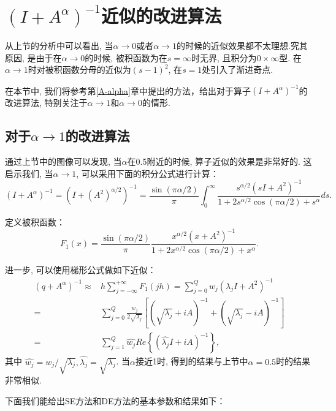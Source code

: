 \section{\((I+{A}^{\alpha})^{-1} \)近似的改进算法}
从上节的分析中可以看出, 当\(\alpha \rightarrow 0\)或者\(\alpha \rightarrow 1\)的时候的近似效果都不太理想.究其原因, 是由于在\(\alpha \rightarrow 0 \)的时候, 被积函数为在\(s=\infty\)时无界, 且积分为\(0\times\infty\)型. 
在$\alpha \rightarrow 1$时对被积函数分母的近似为$(s-1)^2$, 在$s=1$处引入了渐进奇点. 

在本节中, 我们将参考第\ref{A-alpha}章中提出的方法，给出对于算子\((I+A^{\alpha})^{-1}\)的改进算法, 特别关注于\(\alpha\rightarrow 1\)和\(\alpha \rightarrow 0\)的情形. 
\subsection{对于$\alpha \rightarrow 1$的改进算法}
通过上节中的图像可以发现, 当\(\alpha\)在0.5附近的时候, 算子近似的效果是非常好的. 这启示我们, 当$\alpha \rightarrow 1$, 可以采用下面的积分公式进行计算：
\begin{equation}\label{se1_q}
	(I+A^{\alpha})^{-1}=(I+(A^2)^{\alpha/2})^{-1}
	=\frac{\sin(\pi \alpha /2)}{\pi}\int_0^{\infty}\frac{s^{\alpha/2}(sI+A^2)^{-1}}{1+2s^{\alpha/2}\cos(\pi \alpha/2)+s^{\alpha}}ds	.
\end{equation}

定义被积函数：
\begin{equation}
	F_{1}(x)
	=\frac{\sin(\pi \alpha /2)}{\pi}\frac{x^{\alpha/2}(x+A^2)^{-1}}{1+2x^{\alpha/2}\cos(\pi \alpha/2)+x^{\alpha}}.
\end{equation}

进一步, 可以使用梯形公式做如下近似：
\begin{equation}\label{trap_se1}
	\begin{aligned}
		(q+{A}^{\alpha})^{-1}\approx & h\sum_{j=-\infty}^{+\infty} F_1(jh)
		=\sum_{j=0}^{Q}w_j(\lambda_jI+A^2)^{-1}\\
		=&\sum_{j=0}^{Q}\frac{w_j}{2\sqrt{\lambda_j}}\left[\left(\sqrt{\lambda_j}+iA\right)^{-1}+\left(\sqrt{\lambda_j}-iA\right)^{-1}\right]\\
		=&\sum_{j=1}^{Q}\hat{w_j}Re\left\{\left(\hat{\lambda_j}I+iA\right)^{-1}\right\},
	\end{aligned}
\end{equation}
其中 $\hat{w_j}=w_j/\sqrt{\lambda_j}, \hat{\lambda_j}=\sqrt{\lambda_j}$.
当$\alpha$接近1时, 得到的结果与上节中$\alpha=0.5$时的结果非常相似. 

下面我们能给出SE方法和DE方法的基本参数和结果如下：
